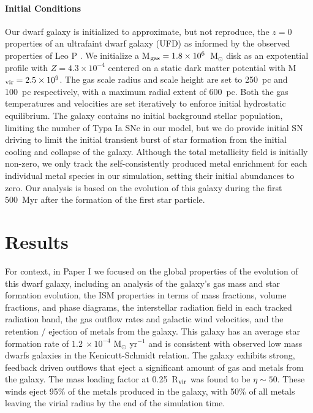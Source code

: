 \documentclass[twocolumn]{aastex61}
\begin{document}
\paragraph{Initial Conditions} Our dwarf galaxy is initialized to approximate, but not reproduce, the $z = 0$ properties of an ultrafaint dwarf galaxy (UFD) as informed by the observed properties of Leo P \citep[see ][]{Giovanelli2013,McQuinn2015a,McQuinn2015}. We initialize a M$_{\rm gas} = 1.8 \times 10^{6}$~M$_{\odot}$ disk as an expotential profile with $Z = 4.3 \times 10^{-4}$ centered on a static \cite{Burkert1995} dark matter potential with M$_{\rm vir} = 2.5 \times 10^{9}$. The gas scale radius and scale height are set to 250~pc and 100~pc respectively, with a maximum radial extent of 600~pc. Both the gas temperatures and velocities are set iteratively to enforce initial hydrostatic equilibrium. The galaxy contains no initial background stellar population, limiting the number of Typa Ia SNe in our model, but we do provide initial SN driving to limit the initial transient burst of star formation from the initial cooling and collapse of the galaxy. Although the total metallicity field is initially non-zero, we only track the self-consistently produced metal enrichment for each individual metal species in our simulation, setting their initial abundances to zero. Our analysis is based on the evolution of this galaxy during the first 500~Myr after the formation of the first star particle.

\section{Results}
For context, in Paper I we focused on the global properties of the evolution of this dwarf galaxy, including an analysis of the galaxy's gas mass and star formation evolution, the ISM properties in terms of mass fractions, volume fractions, and phase diagrams, the interstellar radiation field in each tracked radiation band, the gas outflow rates and galactic wind velocities, and the retention / ejection of metals from the galaxy. This galaxy has an average star formation rate of $1.2~\times 10^{-4}$ M$_{\odot}$ yr$^{-1}$ and is consistent with observed low mass dwarfs galaxies in the Kenicutt-Schmidt relation.  The galaxy exhibits strong, feedback driven outflows that eject a significant amount of gas and metals from the galaxy. The mass loading factor at 0.25~R$_{\rm vir}$ was found to be $\eta \sim 50$. These winds eject 95\% of the metals produced in the galaxy, with 50\% of all metals leaving the virial radius by the end of the simulation time.
\end{document}

